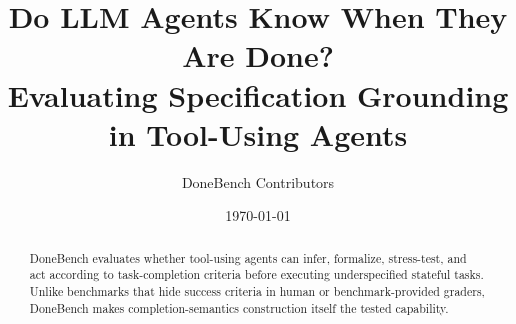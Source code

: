 \documentclass[11pt]{article}
\title{Do LLM Agents Know When They Are Done?\\Evaluating Specification Grounding in Tool-Using Agents}
\author{DoneBench Contributors}
\date{\today}
\begin{document}
\maketitle

\begin{abstract}
DoneBench evaluates whether tool-using agents can infer, formalize, stress-test, and act according to task-completion criteria before executing underspecified stateful tasks. Unlike benchmarks that hide success criteria in human or benchmark-provided graders, DoneBench makes completion-semantics construction itself the tested capability.
\end{abstract}










\appendix




\end{document}
